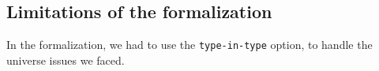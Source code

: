 \documentclass[preprint,9pt,numbers]{sigplanconf}
\DeclareMathOperator{\Type}{Type}
\DeclareMathOperator{\IsHProp}{IsHProp}
\DeclareMathOperator{\id}{id}
\begin{document}

\subsection{Limitations of the formalization}
\label{sec:limit-form}

In the formalization, we had to use the \texttt{type-in-type} option, to handle
the universe issues we faced.


\end{document}
